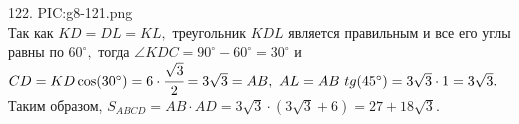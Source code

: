 122. {{PIC:g8-121.png}}\\
Так как $KD=DL=KL,$ треугольник $KDL$ является правильным и все его углы равны по $60^\circ,$ тогда $\angle KDC=90^\circ-60^\circ=30^\circ$ и $CD=KD\cos(30^\circ)=6\cdot\cfrac{\sqrt{3}}{2}=3\sqrt{3}=AB,\ AL=AB\ tg(45^\circ)=3\sqrt{3}\cdot1=3\sqrt{3}.$ Таким образом, $S_{ABCD}=AB\cdot AD=3\sqrt{3}\cdot(3\sqrt{3}+6)=27+18\sqrt{3}.$\\
